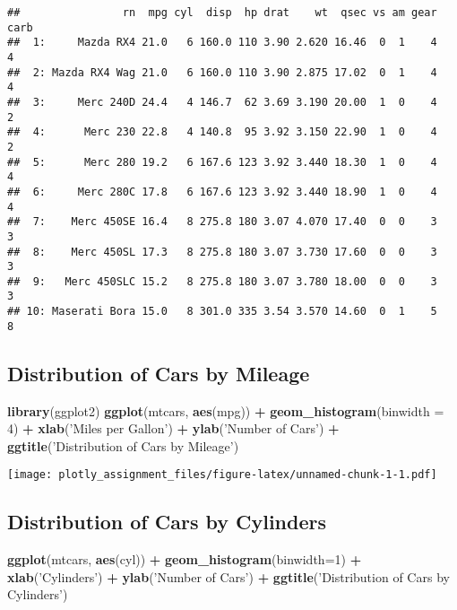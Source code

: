 \documentclass[]{article}
\newenvironment{Shaded}{\begin{snugshade}}{\end{snugshade}}
\newcommand{\DataTypeTok}[1]{\textcolor[rgb]{0.13,0.29,0.53}{#1}}
\newcommand{\DecValTok}[1]{\textcolor[rgb]{0.00,0.00,0.81}{#1}}
\newcommand{\KeywordTok}[1]{\textcolor[rgb]{0.13,0.29,0.53}{\textbf{#1}}}
\newcommand{\NormalTok}[1]{#1}
\newcommand{\OperatorTok}[1]{\textcolor[rgb]{0.81,0.36,0.00}{\textbf{#1}}}
\newcommand{\StringTok}[1]{\textcolor[rgb]{0.31,0.60,0.02}{#1}}
\begin{document}
\begin{verbatim}
##                rn  mpg cyl  disp  hp drat    wt  qsec vs am gear carb
##  1:     Mazda RX4 21.0   6 160.0 110 3.90 2.620 16.46  0  1    4    4
##  2: Mazda RX4 Wag 21.0   6 160.0 110 3.90 2.875 17.02  0  1    4    4
##  3:     Merc 240D 24.4   4 146.7  62 3.69 3.190 20.00  1  0    4    2
##  4:      Merc 230 22.8   4 140.8  95 3.92 3.150 22.90  1  0    4    2
##  5:      Merc 280 19.2   6 167.6 123 3.92 3.440 18.30  1  0    4    4
##  6:     Merc 280C 17.8   6 167.6 123 3.92 3.440 18.90  1  0    4    4
##  7:    Merc 450SE 16.4   8 275.8 180 3.07 4.070 17.40  0  0    3    3
##  8:    Merc 450SL 17.3   8 275.8 180 3.07 3.730 17.60  0  0    3    3
##  9:   Merc 450SLC 15.2   8 275.8 180 3.07 3.780 18.00  0  0    3    3
## 10: Maserati Bora 15.0   8 301.0 335 3.54 3.570 14.60  0  1    5    8
\end{verbatim}

\hypertarget{distribution-of-cars-by-mileage}{%
\subsection{Distribution of Cars by
Mileage}\label{distribution-of-cars-by-mileage}}

\begin{Shaded}
\begin{Highlighting}[]
\KeywordTok{library}\NormalTok{(ggplot2)}
\KeywordTok{ggplot}\NormalTok{(mtcars, }\KeywordTok{aes}\NormalTok{(mpg)) }\OperatorTok{+}
\StringTok{  }\KeywordTok{geom_histogram}\NormalTok{(}\DataTypeTok{binwidth =} \DecValTok{4}\NormalTok{) }\OperatorTok{+}\StringTok{ }\KeywordTok{xlab}\NormalTok{(}\StringTok{'Miles per Gallon'}\NormalTok{) }\OperatorTok{+}\StringTok{ }\KeywordTok{ylab}\NormalTok{(}\StringTok{'Number of Cars'}\NormalTok{) }\OperatorTok{+}\StringTok{ }
\StringTok{   }\KeywordTok{ggtitle}\NormalTok{(}\StringTok{'Distribution of Cars by Mileage'}\NormalTok{)}
\end{Highlighting}
\end{Shaded}

\texttt{[image: plotly\_assignment\_files/figure-latex/unnamed-chunk-1-1.pdf]}

\hypertarget{distribution-of-cars-by-cylinders}{%
\subsection{Distribution of Cars by
Cylinders}\label{distribution-of-cars-by-cylinders}}

\begin{Shaded}
\begin{Highlighting}[]
\KeywordTok{ggplot}\NormalTok{(mtcars, }\KeywordTok{aes}\NormalTok{(cyl)) }\OperatorTok{+}
\StringTok{  }\KeywordTok{geom_histogram}\NormalTok{(}\DataTypeTok{binwidth=}\DecValTok{1}\NormalTok{) }\OperatorTok{+}\StringTok{ }\KeywordTok{xlab}\NormalTok{(}\StringTok{'Cylinders'}\NormalTok{) }\OperatorTok{+}\StringTok{ }\KeywordTok{ylab}\NormalTok{(}\StringTok{'Number of Cars'}\NormalTok{) }\OperatorTok{+}
\StringTok{   }\KeywordTok{ggtitle}\NormalTok{(}\StringTok{'Distribution of Cars by Cylinders'}\NormalTok{)}
\end{Highlighting}
\end{Shaded}
\end{document}

